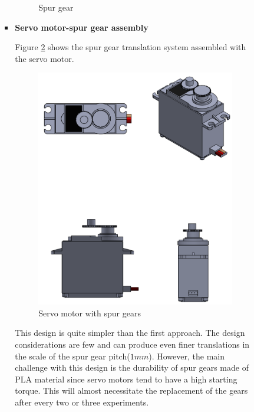\begin{enumerate}
\begin{enumerate}
\begin{enumerate}
\begin{itemize}
\begin{figure}[H]
                  \caption{Spur gear}
                  \label{fig:spur_gear}
              \end{figure}
              \par 
              \item  \textbf{Servo motor-spur gear assembly}
              \par
              Figure \ref{fig:servo_motor_with_spur_gears} shows the spur gear translation system assembled with the servo motor.
              \begin{figure}[H]
                  \centering
                  \includegraphics[height=.55\textheight]{Figures/ServoMotorWithSpurGears.PNG}
                  \caption{Servo motor with spur gears}
                  \label{fig:servo_motor_with_spur_gears}
              \end{figure}
              This design is quite simpler than the first approach. The design considerations are few and can produce even finer translations in the scale of the spur gear pitch($1 mm$). However, the main challenge with this design is the durability of spur gears made of PLA material since servo motors tend to have a high starting torque. This will almost necessitate the replacement of the gears after every two or three experiments.  

\end{itemize}
\end{enumerate}
\end{enumerate}
\end{enumerate}

